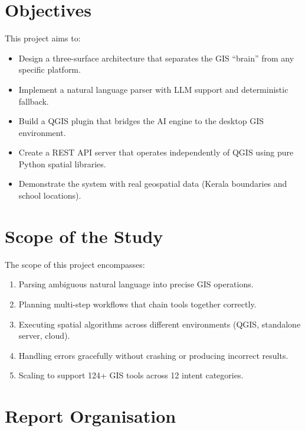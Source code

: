 \documentclass[12pt,a4paper]{report}
\begin{document}
\section{Objectives}

This project aims to:

\begin{itemize}
  \item Design a three-surface architecture that separates the GIS ``brain'' from any specific platform.
  \item Implement a natural language parser with LLM support and deterministic fallback.
  \item Build a QGIS plugin that bridges the AI engine to the desktop GIS environment.
  \item Create a REST API server that operates independently of QGIS using pure Python spatial libraries.
  \item Demonstrate the system with real geospatial data (Kerala boundaries and school locations).
\end{itemize}

\section{Scope of the Study}

The scope of this project encompasses:

\begin{enumerate}
  \item Parsing ambiguous natural language into precise GIS operations.
  \item Planning multi-step workflows that chain tools together correctly.
  \item Executing spatial algorithms across different environments (QGIS, standalone server, cloud).
  \item Handling errors gracefully without crashing or producing incorrect results.
  \item Scaling to support 124+ GIS tools across 12 intent categories.
\end{enumerate}

\section{Report Organisation}
\end{document}
